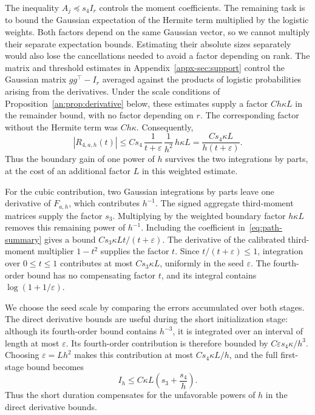 \documentclass[11pt,letterpaper,twoside,leqno]{article}
\theoremstyle{bookplain}
\theoremstyle{bookremark}
\begin{document}
{{
The inequality \(A_j\preceq s_4I_r\) controls the moment
coefficients. The remaining task is to bound the Gaussian
expectation of the Hermite term multiplied by the logistic weights.
Both factors depend on the same Gaussian vector, so we cannot
multiply their separate expectation bounds.
Estimating their absolute sizes separately would also lose the
cancellations needed to avoid a factor depending on rank.
The matrix and threshold estimates in
Appendix~\ref{appx-sec:support} control the Gaussian matrix
\(gg^\top-I_r\) averaged against the products of logistic
probabilities arising from the derivatives. Under the scale
conditions of Proposition~\ref{an:prop:derivative} {below}, these estimates
supply a factor \(Ch{\kappa L}\) in the remainder bound, with no factor
depending on \(r\). The corresponding factor without the Hermite
term was \(Ch{\kappa}\).
Consequently,
\[
 |R_{4,a,h}(t)|
 \le Cs_4\,\frac1{t+\varepsilon}\,\frac1{h^2}\,h{\kappa L}
 =\frac{Cs_4{\kappa L}}{h(t+\varepsilon)}.
\]
Thus the boundary gain of one power of \(h\) survives the two
integrations by parts, at the cost of an additional factor \(L\)
in this weighted estimate.

For the cubic contribution, two Gaussian integrations by parts
leave one derivative of \(F_{a,h}\), which contributes \(h^{-1}\).
The signed aggregate third-moment matrices supply the factor
\(s_3\). Multiplying by the weighted boundary factor \(h{\kappa L}\)
removes this remaining power of \(h^{-1}\).
Including the coefficient in~\eqref{eq:path-summary} gives a bound
\(Cs_3{\kappa L}t/(t+\varepsilon)\).
The derivative of the calibrated third-moment multiplier
\(1-t^2\) supplies the factor \(t\). Since \(t/(t+\varepsilon)\le1\),
integration over \(0\le t\le1\) contributes at most \(Cs_3{\kappa L}\),
uniformly in the seed \(\varepsilon\). The fourth-order bound
has no compensating factor \(t\), and its integral contains
\(\log(1+1/\varepsilon)\).

We choose the seed scale by comparing the errors accumulated over
both stages. The direct derivative bounds are useful during the short
initialization stage: although its fourth-order bound contains
\(h^{-3}\), it is integrated over an interval of length at most
\(\varepsilon\). Its fourth-order contribution is therefore bounded by
\(C\varepsilon s_4{\kappa}/h^3\). Choosing \(\varepsilon=Lh^2\)
makes this contribution at most \(Cs_4{\kappa L}/h\), and the full
first-stage bound becomes
\[
 I_h\le C{\kappa L}\left(s_3+\frac{s_4}{h}\right).
\]
Thus the short duration compensates for the unfavorable powers of
\(h\) in the direct derivative bounds.

}}
\end{document}
